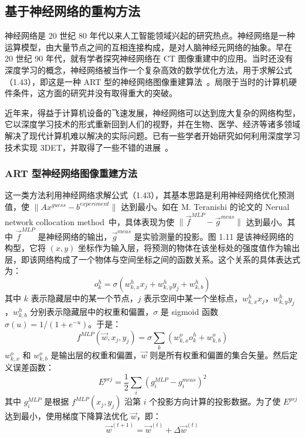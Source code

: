 \subsection{基于神经网络的重构方法}
神经网络是 20 世纪 80 年代以来人工智能领域兴起的研究热点。神经网络是一种运算模型，由大量节点之间的互相连接构成，是对人脑神经元网络的抽象。早在 20 世纪 90 年代，就有学者探究神经网络在 CT 图像重建中的应用。当时还没有深度学习的概念，神经网络被当作一个复杂高效的数学优化方法，用于求解公式（1.43），即这是一种 ART 型的神经网络图像重建算法~\cite{Srinivasan1993,Ma2000,Deming1998,Cichocki1995,Wang2006,Teranishi2016}。局限于当时的计算机硬件条件，这方面的研究并没有取得重大的突破。

近年来，得益于计算机设备的飞速发展，神经网络可以达到庞大复杂的网络构型，它以深度学习技术的形式重新回到人们的视野，并在生物、医学、经济等诸多领域解决了现代计算机难以解决的实际问题。已有一些学者开始研究如何利用深度学习技术实现 3DET，并取得了一些不错的进展~\cite{Ding2019,Pelt2013,Bladt2015,YangF2015}。

\subsubsection{ART 型神经网络图像重建方法}
这一类方法利用神经网络求解公式（1.43），其基本思路是利用神经网络优化预测值，使 $\lVert Ax^{guess}-b^{experiment} \lVert$ 达到最小。如在 M. Teranishi 的论文的 Nerual network collocation method~\cite{Teranishi2016}中，具体表现为使 $\lVert \vec{f}^{MLP}-\vec{g}^{meas} \lVert$ 达到最小。其中 $\vec{f}^{MLP}$ 是神经网络的输出，$\vec{g}^{meas}$ 是实验测量的投影。图 1.11 是该神经网络的构型，它将 $(x,y)$ 坐标作为输入层，将预测的物体在该坐标处的强度值作为输出层，即该网络构成了一个物体与空间坐标之间的函数关系。这个关系的具体表达式为：
\begin{equation}
o^h_k = \sigma(w^h_{k,x}x_j + w^h_{k,y}y_j + w^h_{k,b})
\end{equation}
其中 $k$ 表示隐藏层中的某一个节点，$j$ 表示空间中某一个坐标点，$w^h_{k,x}x_j$，$w^h_{k,y}y_j$，$w^h_{k,b}$ 分别表示隐藏层中的权重和偏置，$\sigma$ 是 sigmoid 函数 $\sigma(u)=1/(1+e^{-u})$。于是：
\begin{equation}
f^{MLP}(\vec{w}, x_j,y_j)= \sigma \sum_{k}(w^o_{k,x}o^h_k + w^o_{k,b})
\end{equation}
$w^o_{k,x}$ 和 $w^o_{k,b}$ 是输出层的权重和偏置，$\vec{w}$ 则是所有权重和偏置的集合矢量。然后定义误差函数：
\begin{equation}
E^{prj} = \frac{1}{2}\sum_{i}(g_i^{MLP}-g_i^{meas})^2
\end{equation}
其中 $g_i^{MLP}$ 是根据 $f^{MLP}(x_j,y_j)$ 沿第 $i$ 个投影方向计算的投影数据。为了使 $E^{prj}$ 达到最小，使用梯度下降算法优化 $\vec{w}$，即：
\begin{equation}
\vec{w}^{(t+1)} = \vec{w}^{(t)} + \Delta \vec{w}^{(t)}
\end{equation}

